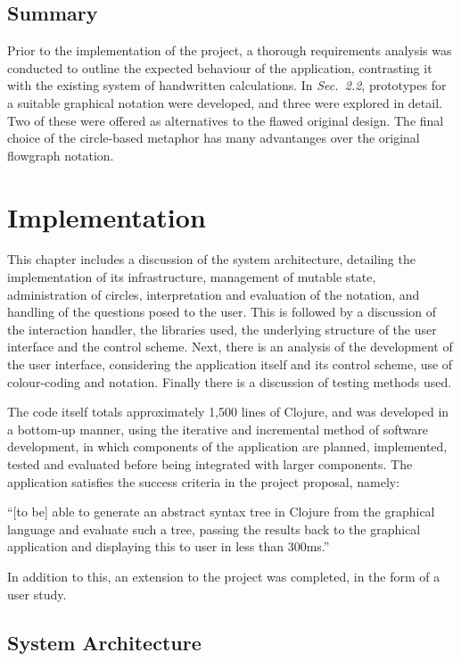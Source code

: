 \documentclass[12pt,twoside,notitlepage,xetex]{report}
\begin{document}
\section{Summary}

Prior to the implementation of the project, a thorough requirements analysis was conducted to outline the expected behaviour of the application, contrasting it with the existing system of handwritten calculations.  In \emph{Sec.~2.2}, prototypes for a suitable graphical notation were developed, and three were explored in detail.  Two of these were offered as alternatives to the flawed original design.  The final choice of the circle-based metaphor has many advantanges over the original flowgraph notation.

\cleardoublepage
\chapter{Implementation}

This chapter includes a discussion of the system architecture, detailing the implementation of its infrastructure, management of mutable state, administration of circles, interpretation and evaluation of the notation, and handling of the questions posed to the user.  This is followed by a discussion of the interaction handler, the libraries used, the underlying structure of the user interface and the control scheme.  Next, there is an analysis of the development of the user interface, considering the application itself and its control scheme, use of colour-coding and notation.  Finally there is a discussion of testing methods used.

The code itself totals approximately 1,500 lines of Clojure, and was developed in a bottom-up manner, using the iterative and incremental method of software development, in which components of the application are planned, implemented, tested and evaluated before being integrated with larger components.  The application satisfies the success criteria in the project proposal, namely:
\begin{center}
\parbox[c]{\textwidth-2cm}{
\small
``[to be] able to generate an abstract syntax tree in Clojure from the graphical language and evaluate such a tree, passing the results back to the graphical application and displaying this to user in less than 300ms.''
}
\end{center}
In addition to this, an extension to the project was completed, in the form of a user study.

\section{System Architecture}
\end{document}
